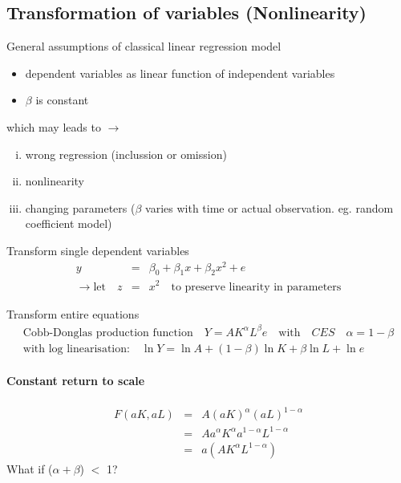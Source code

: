 \subsection{Transformation of variables (Nonlinearity)}
General assumptions of classical linear regression model
\begin{itemize}
\item dependent variables as linear function of independent variables
\item $\beta$ is constant
\end{itemize}
which may leads to $\to$ \begin{enumerate}[(i)]
\item wrong regression (inclussion or omission)
\item nonlinearity
\item changing parameters ($\beta$ varies with time or actual observation. eg. random coefficient model)
\end{enumerate}
 Transform single dependent variables
\begin{eqnarray*}
y &=& \beta_{0}+\beta_{1}x+\beta_{2}x^{2}+e\\
\to \text{let}\quad z &=& x^{2} \quad \text{to preserve linearity in parameters}
\end{eqnarray*}
 Transform entire equations
\begin{eqnarray*}
\text{Cobb-Donglas production function}\quad Y=AK^{\alpha}L^{\beta}e \quad\text{with}\quad CES\quad \alpha=1-\beta\\
\text{with log linearisation:}\quad \ln Y=\ln A + (1-\beta)\ln K + \beta\ln L + \ln e
\end{eqnarray*}
\paragraph{Constant return to scale}
\begin{eqnarray*}
F(aK,aL) &=& A(aK)^{\alpha}(aL)^{1-\alpha}\\
&=& Aa^{\alpha}K^{\alpha}a^{1-\alpha}L^{1-\alpha}\\
&=& a(AK^{\alpha}L^{1-\alpha})
\end{eqnarray*}
What if ($\alpha + \beta$) $<$ 1?
